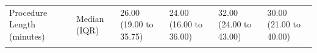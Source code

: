 \documentclass[
  letterpaper,
  DIV=11,
  numbers=noendperiod]{scrreprt}
\begin{document}
\begin{stbl}
{\begin{table}
\begin{tabular*}{\linewidth}{@{\extracolsep{\fill}}llllll}
{Procedure Length (minutes)} & {Median (IQR)} & {26.00 (19.00 to 35.75)} & {24.00 (16.00 to 36.00)} & {32.00 (24.00 to 43.00)} & {30.00 (21.00 to 40.00)} \\ 
{\cellcolor[HTML]{F2F2F2}{Coblation technique}} & {\cellcolor[HTML]{F2F2F2}{Yes}} & {\cellcolor[HTML]{F2F2F2}{241 (55.0)}} & {\cellcolor[HTML]{F2F2F2}{140 (26.5)}} & {\cellcolor[HTML]{F2F2F2}{963 (74.5)}} & {\cellcolor[HTML]{F2F2F2}{1344 (59.5)}} \\ 
\bottomrule
\end{tabular*}
\end{table}

}

\caption{\label{stbl-demo-paed}\textbf{Demographics table - Paediatric
patients.} Participant and surgical data for paediatric cohort
stratified by surgical procedure group. Categorical data as number (\%).
IQR (Interquartile Range), EPR (Electronic Patient Record).}

\end{stbl}%
\end{document}

